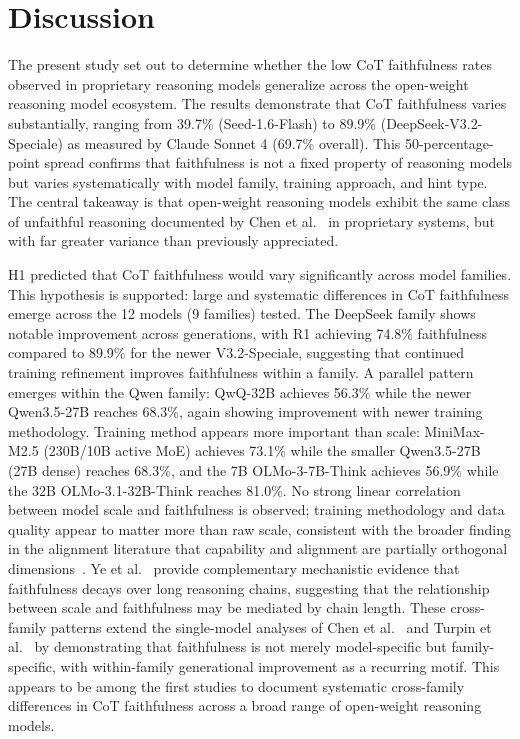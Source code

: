 
\section{Discussion}

The present study set out to determine whether the low CoT faithfulness rates
observed in proprietary reasoning models generalize across the open-weight
reasoning model ecosystem. The results demonstrate that CoT faithfulness varies
substantially, ranging from 39.7\% (Seed-1.6-Flash) to 89.9\%
(DeepSeek-V3.2-Speciale) as measured by Claude Sonnet 4 (69.7\% overall). This
50-percentage-point spread confirms that faithfulness is not a fixed property of
reasoning models but varies systematically with model family, training approach,
and hint type. The central takeaway is that open-weight reasoning models exhibit
the same class of unfaithful reasoning documented by Chen et
al.~\cite{chen2025reasoning} in proprietary systems, but with far greater
variance than previously appreciated.

H1 predicted that CoT faithfulness would vary significantly across model
families. This hypothesis is supported: large and systematic differences in CoT
faithfulness emerge across the 12 models (9 families) tested. The DeepSeek family
shows notable improvement across generations, with R1 achieving 74.8\%
faithfulness compared to 89.9\% for the newer V3.2-Speciale, suggesting that
continued training refinement improves faithfulness within a family. A parallel
pattern emerges within the Qwen family: QwQ-32B achieves 56.3\% while the newer
Qwen3.5-27B reaches 68.3\%, again showing improvement with newer training
methodology. Training method appears more important than scale: MiniMax-M2.5
(230B/10B active MoE) achieves 73.1\% while the smaller Qwen3.5-27B (27B dense)
reaches 68.3\%, and the 7B OLMo-3-7B-Think achieves 56.9\% while the 32B
OLMo-3.1-32B-Think reaches 81.0\%. No strong linear correlation between model
scale and faithfulness is observed; training methodology and data quality appear
to matter more than raw scale, consistent with the broader finding in the
alignment literature that capability and alignment are partially orthogonal
dimensions~\cite{turpin2023unfaithful}. Ye et al.~\cite{ye2026faithfulness} provide complementary mechanistic evidence that faithfulness decays over long reasoning chains, suggesting that the relationship between scale and faithfulness may be mediated by chain length. These cross-family patterns extend the
single-model analyses of Chen et al.~\cite{chen2025reasoning} and Turpin et
al.~\cite{turpin2023unfaithful} by demonstrating that faithfulness is not merely
model-specific but family-specific, with within-family generational improvement
as a recurring motif. This appears to be among the first studies
to document systematic cross-family differences in CoT faithfulness across a
broad range of open-weight reasoning models.

